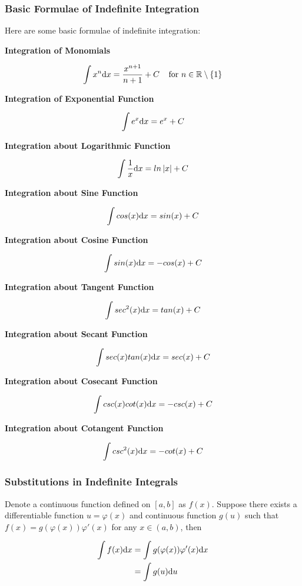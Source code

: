 \documentclass[a4paper,12pt]{article}
\begin{document}
\subsubsection{Basic Formulae of Indefinite Integration}
\begin{thm}
  Here are some basic formulae of indefinite integration:

  \begin{alist}
    \item \textbf{Integration of Monomials}

    $$\int x^{n}\mathrm{d} x=\frac{x^{n+1}}{n+1}+C\;\;\;\;\text{for }n\in\mathbb{R}\setminus\left\{ 1\right\}$$

    \item \textbf{Integration of Exponential Function}

    $$\int e^{x}\mathrm{d} x=e^{x}+C$$

    \item \textbf{Integration about Logarithmic Function}

    $$\int\frac{1}{x}\mathrm{d} x=ln\left| x\right| +C$$

    \item \textbf{Integration about Sine Function}

    $$\int cos(x)\mathrm{d} x=sin(x)+C$$

    \item \textbf{Integration about Cosine Function}

    $$\int sin(x)\mathrm{d} x=-cos(x)+C$$

    \item \textbf{Integration about Tangent Function}

    $$\int sec^{2}(x)\mathrm{d} x=tan(x)+C$$

    \item \textbf{Integration about Secant Function}

    $$\int sec(x)tan(x)\mathrm{d} x=sec(x)+C$$

    \item \textbf{Integration about Cosecant Function}

    $$\int csc(x)cot(x)\mathrm{d} x=-csc(x)+C$$

    \item \textbf{Integration about Cotangent Function}

    $$\int csc^{2}(x)\mathrm{d} x=-cot(x)+C$$
  \end{alist}
\end{thm}

\subsubsection{Substitutions in Indefinite Integrals}
\begin{thm}
  Denote a continuous function defined on $[a,b]$ as $f(x)$. Suppose there exists a differentiable function $u=\varphi(x)$ and continuous function $g(u)$ such that $f(x)=g(\varphi(x))\varphi'(x)$ for any $x\in(a,b)$, then

  $$\begin{aligned}[t]
    \int f(x)\mathrm{d} x&=\int g(\varphi(x))\varphi'(x)\mathrm{d} x\\
    &=\int g(u)\mathrm{d} u
  \end{aligned}$$
\end{thm}
\end{document}
